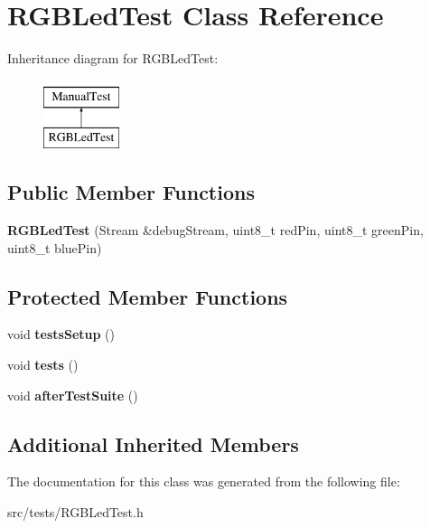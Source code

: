 \hypertarget{class_r_g_b_led_test}{}\section{R\+G\+B\+Led\+Test Class Reference}
\label{class_r_g_b_led_test}
Inheritance diagram for R\+G\+B\+Led\+Test\+:\begin{figure}[H]
\begin{center}
\leavevmode
\includegraphics[height=2.000000cm]{class_r_g_b_led_test}
\end{center}
\end{figure}
\subsection*{Public Member Functions}
\begin{DoxyCompactItemize}
\item 
\mbox{\label{class_r_g_b_led_test_ac1832fe2a45e2534843597b708f435e9}} 
{\bfseries R\+G\+B\+Led\+Test} (Stream \&debug\+Stream, uint8\+\_\+t red\+Pin, uint8\+\_\+t green\+Pin, uint8\+\_\+t blue\+Pin)
\end{DoxyCompactItemize}
\subsection*{Protected Member Functions}
\begin{DoxyCompactItemize}
\item 
\mbox{\label{class_r_g_b_led_test_a52b63e3221a4dc2c3d437c8385ef5939}} 
void {\bfseries tests\+Setup} ()
\item 
\mbox{\label{class_r_g_b_led_test_a6ce1ad63ce0da7208c16e138ad1968a6}} 
void {\bfseries tests} ()
\item 
\mbox{\label{class_r_g_b_led_test_aa8a5797f70948bcd1c9a7015f49cc804}} 
void {\bfseries after\+Test\+Suite} ()
\end{DoxyCompactItemize}
\subsection*{Additional Inherited Members}


The documentation for this class was generated from the following file\+:\begin{DoxyCompactItemize}
\item 
src/tests/R\+G\+B\+Led\+Test.\+h\end{DoxyCompactItemize}
